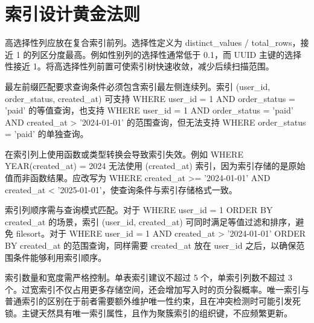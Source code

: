 \chapter{索引设计黄金法则}
高选择性列应放在复合索引前列。选择性定义为 distinct\_{}values / total\_{}rows，接近 1 的列区分度最高。例如性别列的选择性通常低于 0.1，而 UUID 主键的选择性接近 1。将高选择性列前置可使索引树快速收敛，减少后续扫描范围。\par
最左前缀匹配要求查询条件必须包含索引最左侧连续列。索引 (user\_{}id, order\_{}status, created\_{}at) 可支持 WHERE user\_{}id = 1 AND order\_{}status = 'paid' 的等值查询，也支持 WHERE user\_{}id = 1 AND order\_{}status = 'paid' AND created\_{}at > '2024-01-01' 的范围查询，但无法支持 WHERE order\_{}status = 'paid' 的单独查询。\par
在索引列上使用函数或类型转换会导致索引失效。例如 WHERE YEAR(created\_{}at) = 2024 无法使用 (created\_{}at) 索引，因为索引存储的是原始值而非函数结果。应改写为 WHERE created\_{}at >= '2024-01-01' AND created\_{}at < '2025-01-01'，使查询条件与索引存储格式一致。\par
索引列顺序需与查询模式匹配。对于 WHERE user\_{}id = 1 ORDER BY created\_{}at 的场景，索引 (user\_{}id, created\_{}at) 可同时满足等值过滤和排序，避免 filesort。对于 WHERE user\_{}id = 1 AND created\_{}at > '2024-01-01' ORDER BY created\_{}at 的范围查询，同样需要 created\_{}at 放在 user\_{}id 之后，以确保范围条件能够利用索引顺序。\par
索引数量和宽度需严格控制。单表索引建议不超过 5 个，单索引列数不超过 3 个。过宽索引不仅占用更多存储空间，还会增加写入时的页分裂概率。唯一索引与普通索引的区别在于前者需要额外维护唯一性约束，且在冲突检测时可能引发死锁。主键天然具有唯一索引属性，且作为聚簇索引的组织键，不应频繁更新。\par
